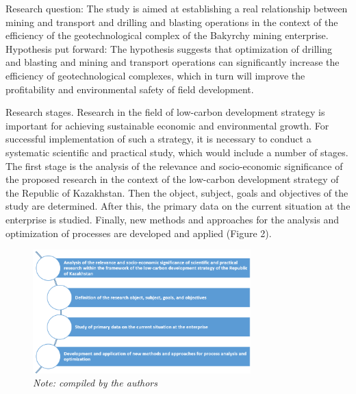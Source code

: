 \begin{multicols}{2}
Research question: The study is aimed at establishing a real
relationship between mining and transport and drilling and blasting
operations in the context of the efficiency of the geotechnological
complex of the Bakyrchy mining enterprise. Hypothesis put forward: The
hypothesis suggests that optimization of drilling and blasting and
mining and transport operations can significantly increase the
efficiency of geotechnological complexes, which in turn will improve the
profitability and environmental safety of field development.

Research stages. Research in the field of low-carbon development
strategy is important for achieving sustainable economic and
environmental growth. For successful implementation of such a strategy,
it is necessary to conduct a systematic scientific and practical study,
which would include a number of stages. The first stage is the analysis
of the relevance and socio-economic significance of the proposed
research in the context of the low-carbon development strategy of the
Republic of Kazakhstan. Then the object, subject, goals and objectives
of the study are determined. After this, the primary data on the current
situation at the enterprise is studied. Finally, new methods and
approaches for the analysis and optimization of processes are developed
and applied (Figure 2).
\end{multicols}

\begin{figure}[H]
	\centering
	\includegraphics[width=0.75\textwidth]{media/gorn4/image5}
	\caption*{Fig.2 - Research stages}
	\caption*{\normalfont\emph{Note: compiled by the authors}}
\end{figure}

